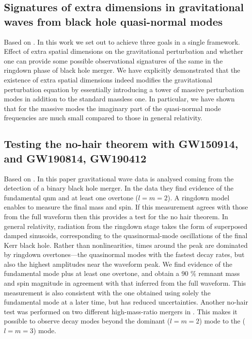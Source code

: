 \documentclass[12 pt]{article}
\begin{document}
	\subsection{Signatures of extra dimensions in gravitational waves from black hole quasi-normal
		modes}
	Based on \cite{extraDQNM}.
	In this work we set out to achieve three goals in a single framework. Effect of extra spatial dimensions on the gravitational perturbation and whether one can provide some possible observational signatures of the same in the ringdown phase of black hole merger. We have explicitly demonstrated that the existence of extra spatial dimensions indeed modifies the gravitational perturbation equation by essentially introducing a tower of massive perturbation modes in addition to the standard massless one.  In particular, we have shown that for the massive modes the imaginary part of the quasi-normal
	mode frequencies are much small compared to those in general relativity. 
	
	\subsection{Testing the no-hair theorem with GW150914, and GW190814, GW190412}
	Based on \cite{TESTINGNOHAIR}.
	In this paper gravitational wave data is analysed coming from the detection of a binary black hole merger. In the data they find evidence of the fundamental qnm and at least one overtone ($l = m = 2$). A ringdown model enables to measure the final mass and spin. If this measurement agrees with those from the full waveform then this provides a test for the no hair theorem. In general relativity, radiation from the ringdown stage takes the form of superposed damped sinusoids, corresponding to the quasinormal-mode oscillations of the final Kerr black hole. Rather than nonlinearities, times around the peak are dominated by ringdown overtones—the quasinormal modes with the fastest decay rates, but also the highest amplitudes near the waveform peak. We find evidence of the fundamental mode plus at least one overtone, and obtain a 90 $\%$
	remnant mass and spin magnitude in agreement with that inferred from the full waveform. This measurement is also consistent with the one obtained using solely the fundamental mode at a later time, but has reduced uncertainties.
	Another no-hair test was performed on two different high-mass-ratio mergers in \cite{nohair2}. This makes it possible to observe decay modes beyond the dominant ($l = m = 2$) mode to the ($l = m = 3$) mode. 
	
\end{document}
